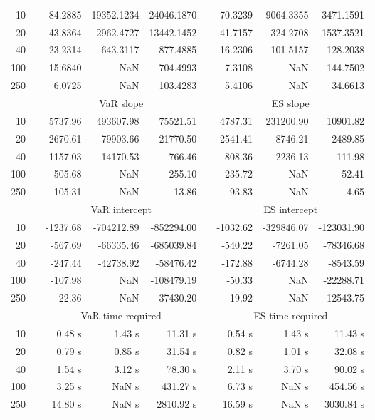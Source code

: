 {{\begin{longtable}{rr rrr r rrr}
10 &&  84.2885 & 19352.1234 & 24046.1870 & & 70.3239 & 9064.3355 & 3471.1591 \\ 
20 &&  43.8364 & 2962.4727 & 13442.1452 & & 41.7157 & 324.2708 & 1537.3521 \\ 
40 &&  23.2314 & 643.3117 & 877.4885 & & 16.2306 & 101.5157 & 128.2038 \\ 
100 &&  15.6840 &    NaN & 704.4993 & & 7.3108 &    NaN & 144.7502 \\ 
250 &&  6.0725 &    NaN & 103.4283 & & 5.4106 &    NaN & 34.6613 \\ 
\hline 
 & & \multicolumn{3}{c}{ VaR slope} && \multicolumn{3}{c}{ES slope} \\ \cline{3-5}  \cline{7-9}
10 && 5737.96 & 493607.98 & 75521.51 && 4787.31 & 231200.90 & 10901.82 \\ 
20 && 2670.61 & 79903.66 & 21770.50 && 2541.41 & 8746.21 & 2489.85 \\ 
40 && 1157.03 & 14170.53 & 766.46 && 808.36 & 2236.13 & 111.98 \\ 
100 && 505.68 &  NaN & 255.10 && 235.72 &  NaN & 52.41 \\ 
250 && 105.31 &  NaN & 13.86 && 93.83 &  NaN & 4.65 \\ 
\hline 
 & & \multicolumn{3}{c}{ VaR intercept} &&  \multicolumn{3}{c}{ES intercept} \\ \cline{3-5}  \cline{7-9}
10 &&  -1237.68 & -704212.89 & -852294.00 && -1032.62 & -329846.07 & -123031.90 \\ 
20 &&  -567.69 & -66335.46 & -685039.84 && -540.22 & -7261.05 & -78346.68 \\ 
40 &&  -247.44 & -42738.92 & -58476.42 && -172.88 & -6744.28 & -8543.59 \\ 
100 &&  -107.98 &  NaN & -108479.19 && -50.33 &  NaN & -22288.71 \\ 
250 &&  -22.36 &  NaN & -37430.20 && -19.92 &  NaN & -12543.75 \\ 
\hline 
 & & \multicolumn{3}{c}{VaR time required} && \multicolumn{3}{c}{ES time required} \\ \cline{3-5}  \cline{7-9}
10 & & 0.48 s & 1.43 s & 11.31 s && 0.54 s & 1.43 s & 11.43 s \\ 
20 & & 0.79 s & 0.85 s & 31.54 s && 0.82 s & 1.01 s & 32.08 s \\ 
40 & & 1.54 s & 3.12 s & 78.30 s && 2.11 s & 3.70 s & 90.02 s \\ 
100 & & 3.25 s &  NaN s & 431.27 s && 6.73 s &  NaN s & 454.56 s \\ 
250 & & 14.80 s &  NaN s & 2810.92 s && 16.59 s &  NaN s & 3030.84 s \\ 

\end{longtable}}}
